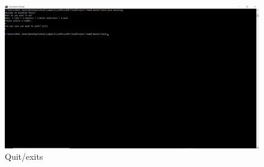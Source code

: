 \documentclass[]{article}
\begin{document}
\begin{figure}
\centering
\includegraphics{../images/quit.png}
\caption{Quit/exits}
\end{figure}
\end{document}
